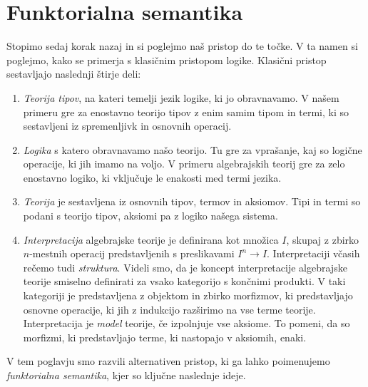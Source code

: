 \documentclass[../kategoricna_logika.tex]{subfiles}
\begin{document}
\section{Funktorialna semantika}
\label{sec:funkt-semant}
%
Stopimo sedaj korak nazaj in si poglejmo naš pristop do te točke.
V ta namen si poglejmo, kako se primerja s klasičnim pristopom logike.
Klasični pristop sestavljajo naslednji štirje deli:
\begin{enumerate}
\item \emph{Teorija tipov}, na kateri temelji jezik logike, ki jo obravnavamo.
  V našem primeru gre za enostavno teorijo tipov z enim samim tipom in termi,
  ki so sestavljeni iz spremenljivk in osnovnih operacij.
\item \emph{Logika} s katero obravnavamo našo teorijo. Tu gre za vprašanje,
  kaj so logične operacije, ki jih imamo na voljo. V primeru algebrajskih teorij
  gre za zelo enostavno logiko, ki vključuje le enakosti med termi jezika.
\item \emph{Teorija} je sestavljena iz osnovnih tipov, termov in aksiomov.
  Tipi in termi so podani s teorijo tipov, aksiomi pa z logiko našega sistema.
\item \emph{Interpretacija} algebrajske teorije je definirana kot množica $I$,
  skupaj z zbirko $n$-mestnih operacij predstavljenih s preslikavami $I^n \to I$.
  Interpretaciji včasih rečemo tudi \emph{struktura}. Videli smo, da je
  koncept interpretacije algebrajske teorije smiselno definirati za vsako
  kategorijo s končnimi produkti. V taki kategoriji je predstavljena z
  objektom in zbirko morfizmov, ki predstavljajo osnovne operacije, ki jih
  z indukcijo razširimo na vse terme teorije. Interpretacija je \emph{model}
  teorije, če izpolnjuje vse aksiome. To pomeni, da so
  morfizmi, ki predstavljajo terme, ki nastopajo v aksiomih, enaki.  
\end{enumerate}
V tem poglavju smo razvili alternativen pristop, ki ga lahko poimenujemo
\emph{funktorialna semantika}, kjer so ključne naslednje ideje.
\end{document}
